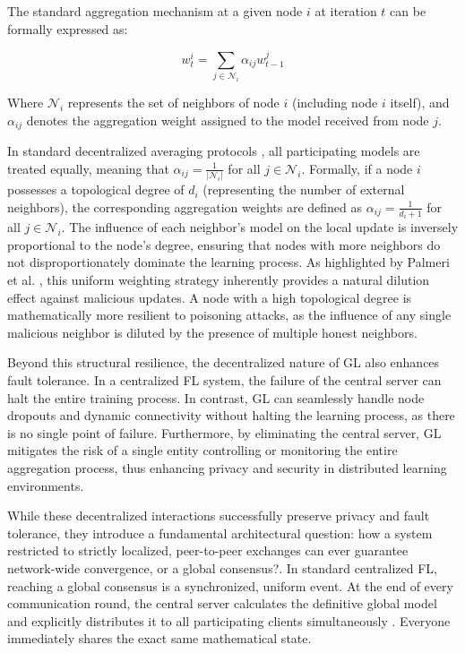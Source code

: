 The standard aggregation mechanism at a given node $i$ at iteration $t$ can be formally expressed as:

\begin{equation}
w_t^i = \sum_{j \in \mathcal{N}_i} \alpha_{ij} w_{t-1}^j
\end{equation}

Where $\mathcal{N}_i$ represents the set of neighbors of node $i$ (including node $i$ itself), and $\alpha_{ij}$ denotes the aggregation weight assigned to the model received from node $j$. 

In standard decentralized averaging protocols \cite{ormandi2013gossip,hegedus2019gossip}, all participating models are treated equally, meaning that $\alpha_{ij} = \frac{1}{|\mathcal{N}_i|}$ for all $j \in \mathcal{N}_i$. Formally, if a node $i$ possesses a topological degree of $d_i$ (representing the number of external neighbors), the corresponding aggregation weights are defined as $\alpha_{ij} = \frac{1}{d_i + 1}$ for all $j \in \mathcal{N}_i$. The influence of each neighbor's model on the local update is inversely proportional to the node's degree, ensuring that nodes with more neighbors do not disproportionately dominate the learning process. As highlighted by Palmeri et al. \cite{palmieri2024impact}, this uniform weighting strategy inherently provides a natural dilution effect against malicious updates. A node with a high topological degree is mathematically more resilient to poisoning attacks, as the influence of any single malicious neighbor is diluted by the presence of multiple honest neighbors.

Beyond this structural resilience, the decentralized nature of GL also enhances fault tolerance. In a centralized FL system, the failure of the central server can halt the entire training process. In contrast, GL can seamlessly handle node dropouts and dynamic connectivity without halting the learning process, as there is no single point of failure. Furthermore, by eliminating the central server, GL mitigates the risk of a single entity controlling or monitoring the entire aggregation process, thus enhancing privacy and security in distributed learning environments.

While these decentralized interactions successfully preserve privacy and fault tolerance, they introduce a fundamental architectural question: how a system restricted to strictly localized, peer-to-peer exchanges can ever guarantee network-wide convergence, or a global consensus?. In standard centralized FL, reaching a global consensus is a synchronized, uniform event. At the end of every communication round, the central server calculates the definitive global model and explicitly distributes it to all participating clients simultaneously \cite{mcmahan2017communication}. Everyone immediately shares the exact same mathematical state. 

